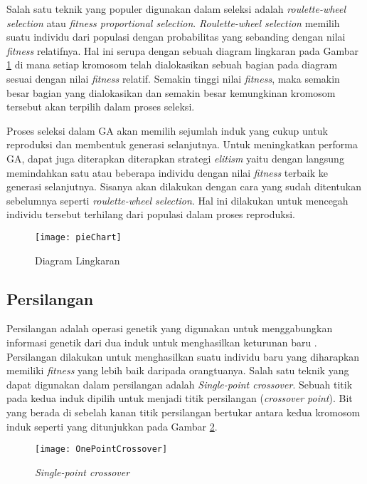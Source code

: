 Salah satu teknik yang populer digunakan dalam seleksi adalah \textit{roulette-wheel selection} atau \textit{fitness proportional selection}. \textit{Roulette-wheel selection} memilih suatu individu dari populasi dengan probabilitas yang sebanding dengan nilai \textit{fitness} relatifnya. Hal ini serupa dengan sebuah diagram lingkaran pada Gambar \ref{fig:pieChart} di mana setiap kromosom telah dialokasikan sebuah bagian pada diagram sesuai dengan nilai \textit{fitness} relatif. Semakin tinggi nilai \textit{fitness}, maka semakin besar bagian yang dialokasikan dan semakin besar kemungkinan kromosom tersebut akan terpilih dalam proses seleksi.

Proses seleksi dalam GA akan memilih sejumlah induk yang cukup untuk reproduksi dan membentuk generasi selanjutnya. Untuk meningkatkan performa GA, dapat juga diterapkan diterapkan strategi \textit{elitism} yaitu dengan langsung memindahkan satu atau beberapa individu dengan nilai \textit{fitness} terbaik ke generasi selanjutnya. Sisanya akan dilakukan dengan cara yang sudah ditentukan sebelumnya seperti \textit{roulette-wheel selection}. Hal ini dilakukan untuk mencegah individu tersebut terhilang dari populasi dalam proses reproduksi.

\begin{figure}[h]
	\begin{center}
		\texttt{[image: pieChart]}
		\caption{Diagram Lingkaran}
		\label{fig:pieChart}
	\end{center}
\end{figure}

\subsection{Persilangan}
\label{sub:crossover}
Persilangan adalah operasi genetik yang digunakan untuk menggabungkan informasi genetik dari dua induk untuk menghasilkan keturunan baru \cite{sivanandam2007introduction}. Persilangan dilakukan untuk menghasilkan suatu individu baru yang diharapkan memiliki \textit{fitness} yang lebih baik daripada orangtuanya. Salah satu teknik yang dapat digunakan dalam persilangan adalah \textit{Single-point crossover}. Sebuah titik pada kedua induk dipilih untuk menjadi titik persilangan (\textit{crossover point}). Bit yang berada di sebelah kanan titik persilangan bertukar antara kedua kromosom induk seperti yang ditunjukkan pada Gambar \ref{fig:spcrossover}.

\begin{figure}[h]
	\begin{center}
		\texttt{[image: OnePointCrossover]}
		\caption{\textit{Single-point crossover}}
		\label{fig:spcrossover}
	\end{center}
\end{figure}

